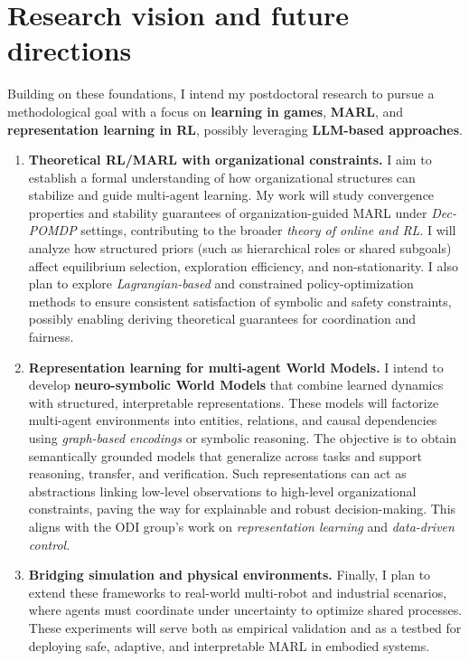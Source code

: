 \documentclass[11pt,a4paper,sans]{moderncv}
\begin{document}
\section*{Research vision and future directions}


Building on these foundations, I intend my postdoctoral research to pursue a methodological goal with a focus on \textbf{learning in games}, \textbf{MARL}, and \textbf{representation learning in RL}, possibly leveraging \textbf{LLM-based approaches}.


\begin{enumerate}
      \item \textbf{Theoretical RL/MARL with organizational constraints.}
            I aim to establish a formal understanding of how organizational structures can stabilize and guide multi-agent learning.
            My work will study convergence properties and stability guarantees of organization-guided MARL under \emph{Dec-POMDP} settings, contributing to the broader \emph{theory of online and RL}.
            I will analyze how structured priors (such as hierarchical roles or shared subgoals) affect equilibrium selection, exploration efficiency, and non-stationarity.
            I also plan to explore \emph{Lagrangian-based} and constrained policy-optimization methods to ensure consistent satisfaction of symbolic and safety constraints, possibly enabling deriving theoretical guarantees for coordination and fairness.

      \item \textbf{Representation learning for multi-agent World Models.}
            I intend to develop \textbf{neuro-symbolic World Models} that combine learned dynamics with structured, interpretable representations.
            These models will factorize multi-agent environments into entities, relations, and causal dependencies using \emph{graph-based encodings} or symbolic reasoning.
            The objective is to obtain semantically grounded models that generalize across tasks and support reasoning, transfer, and verification.
            Such representations can act as abstractions linking low-level observations to high-level organizational constraints, paving the way for explainable and robust decision-making.
            This aligns with the ODI group’s work on \emph{representation learning} and \emph{data-driven control}.

      \item \textbf{Bridging simulation and physical environments.}
            Finally, I plan to extend these frameworks to real-world multi-robot and industrial scenarios, where agents must coordinate under uncertainty to optimize shared processes.
            These experiments will serve both as empirical validation and as a testbed for deploying safe, adaptive, and interpretable MARL in embodied systems.
\end{enumerate}
\end{document}
